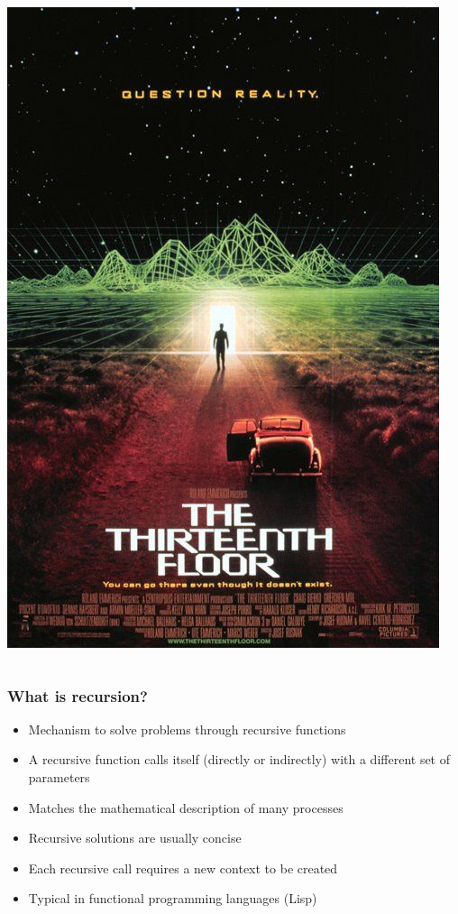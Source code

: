 \documentclass[xcolor=table,10pt,final]{beamer}
\begin{document}
\begin{frame}
\begin{columns}[t,totalwidth=\textwidth]
\begin{column}{.3\linewidth}
			\includegraphics[scale=0.14]{floor}			
		\end{column}
	\end{columns}
\end{frame}
\else
\fi

\begin{frame}
	\frametitle{What is recursion?}
	\begin{itemize}
		\item Mechanism to solve problems through recursive functions
		\item A recursive function calls itself (directly or indirectly) with a different set of parameters
		\item Matches the mathematical description of many processes
		\item Recursive solutions are usually concise
		\item Each recursive call requires a new context to be created
		\item Typical in functional programming languages (Lisp)
	\end{itemize}
\end{frame}
\end{document}
